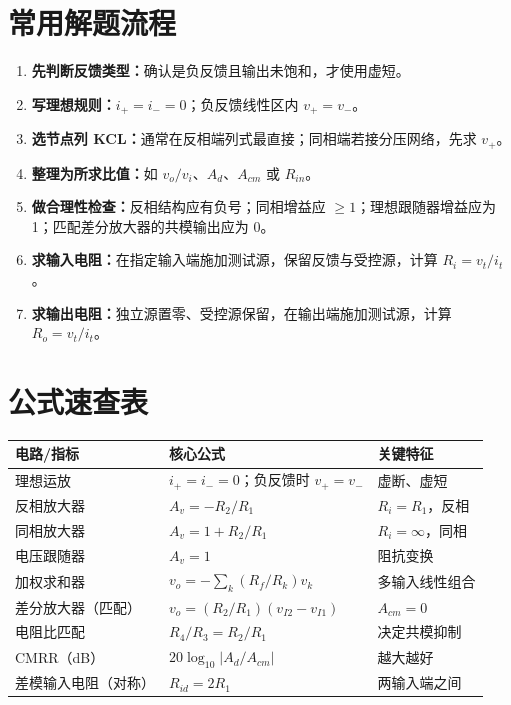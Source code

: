 \documentclass[11pt,fontset=none]{ctexart}
\begin{document}
\section{常用解题流程}

\begin{enumerate}
  \item \textbf{先判断反馈类型：}确认是负反馈且输出未饱和，才使用虚短。
  \item \textbf{写理想规则：}$i_+=i_-=0$；负反馈线性区内 $v_+=v_-$。
  \item \textbf{选节点列 KCL：}通常在反相端列式最直接；同相端若接分压网络，先求 $v_+$。
  \item \textbf{整理为所求比值：}如 $v_o/v_i$、$A_d$、$A_{cm}$ 或 $R_{in}$。
  \item \textbf{做合理性检查：}反相结构应有负号；同相增益应 $\ge1$；理想跟随器增益应为 1；匹配差分放大器的共模输出应为 0。
  \item \textbf{求输入电阻：}在指定输入端施加测试源，保留反馈与受控源，计算 $R_i=v_t/i_t$。
  \item \textbf{求输出电阻：}独立源置零、受控源保留，在输出端施加测试源，计算 $R_o=v_t/i_t$。
\end{enumerate}

\section{公式速查表}

\renewcommand{\arraystretch}{1.22}
\begin{center}
\small
\begin{tabular}{>{\raggedright\arraybackslash}p{}p{}p{}}
\toprule
\textbf{电路/指标} & \textbf{核心公式} & \textbf{关键特征} \\
\midrule
理想运放 & $i_+=i_-=0$；负反馈时 $v_+=v_-$ & 虚断、虚短 \\
反相放大器 & $A_v=-R_2/R_1$ & $R_i=R_1$，反相 \\
同相放大器 & $A_v=1+R_2/R_1$ & $R_i=\infty$，同相 \\
电压跟随器 & $A_v=1$ & 阻抗变换 \\
加权求和器 & $v_o=-\sum_k(R_f/R_k)v_k$ & 多输入线性组合 \\
差分放大器（匹配） & $v_o=(R_2/R_1)(v_{I2}-v_{I1})$ & $A_{cm}=0$ \\
电阻比匹配 & $R_4/R_3=R_2/R_1$ & 决定共模抑制 \\
CMRR（dB） & $20\log_{10}|A_d/A_{cm}|$ & 越大越好 \\
差模输入电阻（对称） & $R_{id}=2R_1$ & 两输入端之间 \\
\bottomrule
\end{tabular}
\end{center}
\end{document}

